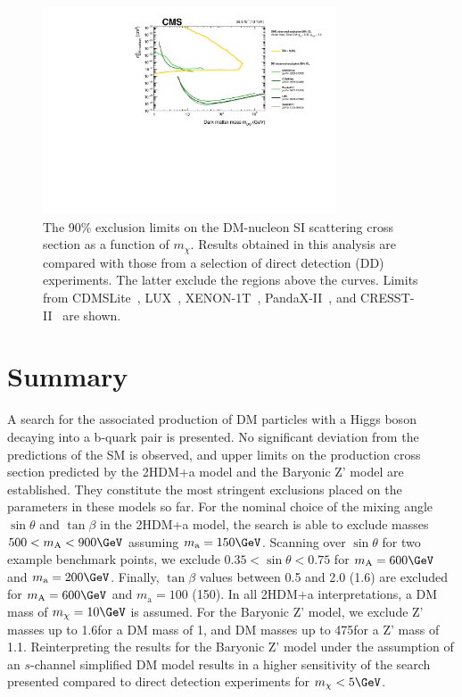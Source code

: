 \begin{figure}
  \centering
  \includegraphics[width=0.775\textwidth]{figures/limits/SpinIndepend_XsecDM_MonoHbb_bb_obs_Summary.pdf}
  \caption{The 90\% \CL exclusion limits on the DM-nucleon SI scattering cross section as a function of $m_\chi$. 
Results obtained in this analysis are compared with those from a selection of direct detection (DD) experiments. 
The latter exclude the regions above the curves. 
Limits from CDMSLite~\cite{CDMSLite}, LUX~\cite{LUX}, XENON-1T~\cite{XENON1T}, PandaX-II~\cite{PandaxII}, and CRESST-II~\cite{CresstII} are shown.}
  \label{fig:limitsdd}
\end{figure}


\section{Summary}

A search for the associated production of DM particles with a Higgs
boson decaying into a b-quark pair is presented. No significant
deviation from the predictions of the SM is observed, and upper limits on
the production cross section predicted by the 2HDM+a model and the
Baryonic Z' model are established. They constitute the  most stringent  exclusions placed on the parameters in these
models so far. For the nominal choice of the mixing angle $\sin\theta$
and $\tan\beta$ in the 2HDM+a model, the search is able to exclude masses
$500<m_\text{A}<900\GeV$ assuming $m_\text{a}=150\GeV$. Scanning over
$\sin\theta$ for two example benchmark points, we exclude
$0.35<\sin\theta<0.75$ for $m_\text{A}=600\GeV$ and
$m_\text{a}=200\GeV$.  Finally, $\tan\beta$ values between 0.5 and 2.0
(1.6) are excluded for $m_\text{A}=600\GeV$ and $m_\text{a}=100$
(150)\GeV. In all 2HDM+a interpretations, a DM mass of $m_\chi=10\GeV$ is assumed. For the Baryonic Z' model, we exclude Z' masses up to 1.6\TeV for a DM mass of 1\GeV, and DM masses up to 475\GeV for a Z' mass of 1.1\TeV. Reinterpreting the results for the Baryonic Z' model under the assumption of an $s$-channel simplified DM model results in a higher sensitivity of the search presented compared to direct detection experiments for $m_\chi<5\GeV$. 

 
